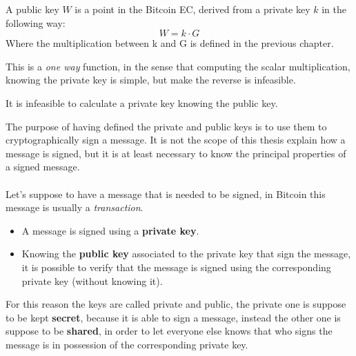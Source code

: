 \begin{definition}
	A public key $W$ is a point in the Bitcoin EC, derived from a private key $k$ in the following way: \\
	\begin{equation}
	W=k\cdot G
	\end{equation}
	Where the multiplication between k and G is defined in the previous chapter.
\end{definition}
This is a \textit{one way} function, in the sense that computing the scalar multiplication, knowing the private key is simple, but make the reverse is infeasible.
\begin{remark}
	It is infeasible to calculate a private key knowing the public key.
\end{remark}
The purpose of having defined the private and public keys is to use them to cryptographically sign a message. It is not the scope of this thesis explain how a message is signed, but it is at least necessary to know the principal properties of a signed message.
\\ \\
Let's suppose to have a message that is needed to be signed, in Bitcoin this message is usually a \textit{transaction}.

\begin{itemize}
	\item A message is signed using a \textbf{private key}.
	\item Knowing the \textbf{public key} associated to the private key that sign the message, it is possible to verify that the message is signed using the corresponding private key (without knowing it).
\end{itemize}
For this reason the keys are called private and public, the private one is suppose to be kept \textbf{secret}, because it is able to sign a message, instead the other one is suppose to be \textbf{shared}, in order to let everyone else knows that who signs the message is in possession of the corresponding private key.





